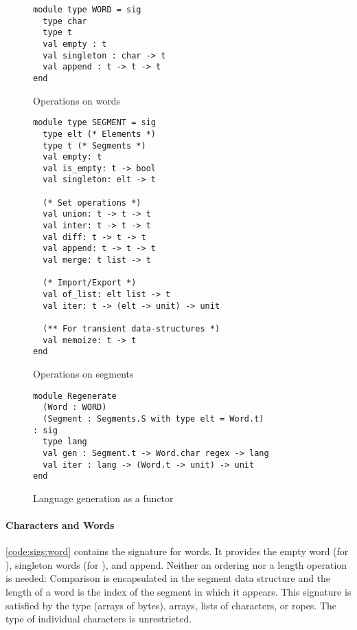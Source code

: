 \begin{figure}[tp]
\begin{lstlisting}
module type WORD = sig
  type char
  type t
  val empty : t
  val singleton : char -> t
  val append : t -> t -> t
end
\end{lstlisting}
\vspace{-\baselineskip}
    \caption{Operations on words}
    \label{code:sigs:word}

\begin{lstlisting}
module type SEGMENT = sig
  type elt (* Elements *)
  type t (* Segments *)
  val empty: t
  val is_empty: t -> bool
  val singleton: elt -> t

  (* Set operations *)
  val union: t -> t -> t
  val inter: t -> t -> t
  val diff: t -> t -> t
  val append: t -> t -> t
  val merge: t list -> t

  (* Import/Export *)
  val of_list: elt list -> t
  val iter: t -> (elt -> unit) -> unit

  (** For transient data-structures *)
  val memoize: t -> t
end
\end{lstlisting}
\vspace{-\baselineskip}
    \caption{Operations on segments}
    \label{code:sigs:segment}
    
\begin{lstlisting}
module Regenerate
  (Word : WORD)
  (Segment : Segments.S with type elt = Word.t)
: sig
  type lang
  val gen : Segment.t -> Word.char regex -> lang
  val iter : lang -> (Word.t -> unit) -> unit
end
\end{lstlisting}
\vspace{-\baselineskip}
    \caption{Language generation as a functor}
    \label{code:sigs:regen}
\end{figure}

\paragraph{Characters and Words}

\autoref{code:sigs:word} contains the signature for words.
It provides
the empty word (for ),
singleton words (for ), and append.
Neither an ordering nor a length operation is needed:
Comparison is encapsulated in the segment
data structure and the length of a word is the index of the segment in
which it appears.
%
This signature is satisfied by the \ocaml {}
type (\ie arrays of bytes), arrays, lists of characters, or ropes. The
type of individual characters is unrestricted.

